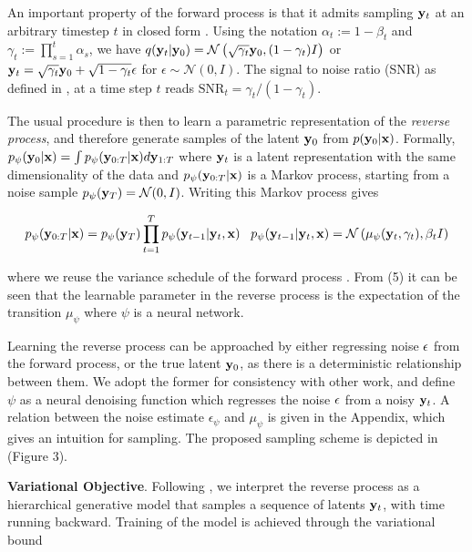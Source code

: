 \documentclass{article}
\begin{document}
An important property of the forward process is that it admits sampling $\bold{y}_t$ at an arbitrary timestep $t$ in closed form \citep{Ho2020}. Using the notation $\alpha_t := 1 - \beta_t$ and $\gamma_t := \prod_{s=1}^{t} \alpha_s$, we have $q(\bold{y}_t|\bold{y}_0) = \mathcal{N} \left(\sqrt{\gamma_{t}} \bold{y}_{0}, (1 - \gamma_t)I \right)$ or $\bold{y}_{t} = \sqrt{\gamma_{t}}\bold{y}_{0} + \sqrt{1-\gamma_{t}}\bold{\epsilon}$ for $\epsilon \sim \mathcal{N}(0,I)$. The signal to noise ratio (SNR) as defined in \citep{Kingma2023}, at a time step $t$ reads $\mathrm{SNR}_t = \gamma_{t}/(1-\gamma_{t})$.

The usual procedure is then to learn a parametric representation of the \emph{reverse process}, and therefore generate samples of the latent $\bold{y}_{0}$ from  $p(\bold{y}_{0}|\bold{x})$. Formally, $p_{\psi}(\bold{y}_{0}|\bold{x}) = \int p_{\psi}(\bold{y}_{0:T}|\bold{x})d\bold{y}_{1:T}$ where $\bold{y}_{t}$ is a latent representation with the same dimensionality of the data and $p_{\psi}(\bold{y}_{0:T}|\bold{x})$ is a Markov process, starting from a noise sample $p_{\psi}(\bold{y}_{T}) = \mathcal{N}(0,I)$. Writing this Markov process gives

\begin{equation}
p_{\psi}(\bold{y}_{0:T}|\bold{x}) = p_{\psi}(\bold{y}_{T})\prod_{t=1}^{T} p_{\psi}(\bold{y}_{t-1}|\bold{y}_{t},\bold{x}) \;\;\; p_{\psi}(\bold{y}_{t-1}|\bold{y}_{t},\bold{x}) = \mathcal{N}\left(\mu_{\psi}(\bold{y}_{t},\gamma_{t}),\beta_{t}I\right)
\end{equation}

where we reuse the variance schedule of the forward process \citep{Ho2020}. From (5) it can be seen that the learnable parameter in the reverse process is the expectation of the transition $\mu_{\psi}$ where $\psi$ is a neural network. 

Learning the reverse process can be approached by either regressing noise $\bold{\epsilon}$ from the forward process, or the true latent $\bold{y}_{0}$, as there is a deterministic relationship between them. We adopt the former for consistency with other work, and define $\psi$ as a neural denoising function which regresses the noise $\bold{\epsilon}$ from a noisy $\bold{y}_{t}$. A relation between the noise estimate $\epsilon_{\psi}$ and $\mu_{\psi}$ is given in the Appendix, which gives an intuition for sampling. The proposed sampling scheme is depicted in (Figure 3). 

\textbf{Variational Objective}. Following \citep{Kingma2021}, we interpret the reverse process as a hierarchical generative model that samples a sequence of latents $\bold{y}_{t}$, with time running backward. Training of the model is achieved through the variational bound
\end{document}
